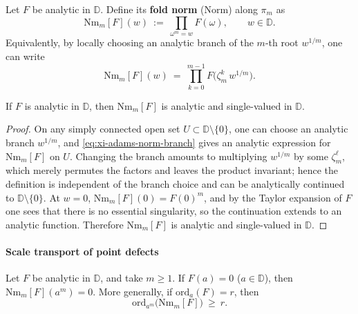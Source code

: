 \begin{definition}\label{def:xi-adams-norm-fold}
Let \(F\) be analytic in \(\mathbb{D}\). Define its \textbf{fold norm} (Norm) along \(\pi_m\) as
\begin{equation}\label{eq:xi-adams-norm-def}
\boxed{\;
\mathrm{Nm}_m[F](w)
~:=~
\prod_{\omega^m=w}F(\omega),
\qquad w\in\mathbb{D}.
\;}
\end{equation}
Equivalently, by locally choosing an analytic branch of the \(m\)-th root \(w^{1/m}\), one can write
\begin{equation}\label{eq:xi-adams-norm-branch}
\mathrm{Nm}_m[F](w)
~=~
\prod_{k=0}^{m-1}F\!\bigl(\zeta_m^k\,w^{1/m}\bigr).
\end{equation}
\end{definition}

\begin{proposition}\label{prop:xi-adams-norm-holomorphic}
If \(F\) is analytic in \(\mathbb{D}\), then \(\mathrm{Nm}_m[F]\) is analytic and single-valued in \(\mathbb{D}\).
\end{proposition}

\begin{proof}
On any simply connected open set \(U\subset\mathbb{D}\setminus\{0\}\), one can choose an analytic branch \(w^{1/m}\), and \eqref{eq:xi-adams-norm-branch} gives an analytic expression for \(\mathrm{Nm}_m[F]\) on \(U\).
Changing the branch amounts to multiplying \(w^{1/m}\) by some \(\zeta_m^\ell\), which merely permutes the factors and leaves the product invariant; hence the definition is independent of the branch choice and can be analytically continued to \(\mathbb{D}\setminus\{0\}\).
At \(w=0\), \(\mathrm{Nm}_m[F](0)=F(0)^m\), and by the Taylor expansion of \(F\) one sees that there is no essential singularity, so the continuation extends to an analytic function.
Therefore \(\mathrm{Nm}_m[F]\) is analytic and single-valued in \(\mathbb{D}\). \qedhere
\end{proof}

\paragraph{Scale transport of point defects}
\begin{theorem}\label{thm:xi-adams-norm-zero-transport}
Let \(F\) be analytic in \(\mathbb{D}\), and take \(m\ge 1\).
If \(F(a)=0\) (\(a\in\mathbb{D}\)), then \(\mathrm{Nm}_m[F](a^m)=0\).
More generally, if \(\mathrm{ord}_a(F)=r\), then
\[
\mathrm{ord}_{a^m}\bigl(\mathrm{Nm}_m[F]\bigr)\ \ge\ r.
\]
\end{theorem}


